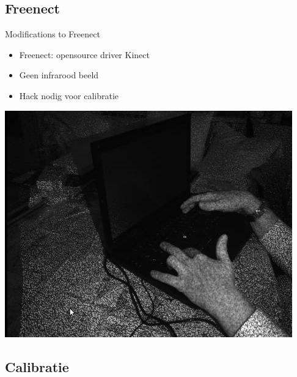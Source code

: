 \documentclass{beamer}
\begin{document}
\subsection{Freenect}
\begin{frame}{Modifications to Freenect}
\begin{itemize}
\item Freenect: opensource driver Kinect
\item Geen infrarood beeld
\item Hack nodig voor calibratie
\end{itemize}
\pause
\includegraphics[scale=0.4]{kinect-ir-image.jpg}

\end{frame}
\subsection{Calibratie}
\end{document}
